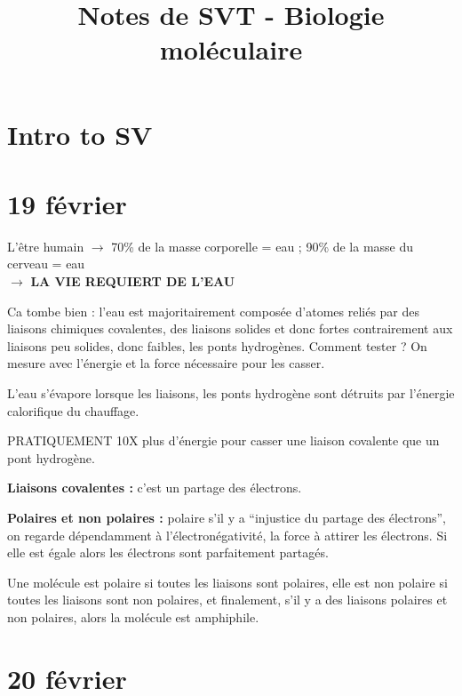 \documentclass[11pt]{article}
\title{Notes de SVT - Biologie moléculaire}
\date{}
\begin{document}
\maketitle



\section*{Intro to SV}

\section*{19 février}

L'être humain $\rightarrow$ 70\% de la masse corporelle = eau ; 90\% de la masse du cerveau = eau\\
$\rightarrow$ \textbf{LA VIE REQUIERT DE L'EAU}

\vspace{0.3cm}

Ca tombe bien : l'eau est majoritairement composée d'atomes reliés par des liaisons chimiques covalentes, des liaisons solides et donc fortes contrairement aux liaisons peu solides, donc faibles, les ponts hydrogènes. Comment tester ? On mesure avec l'énergie et la force nécessaire pour les casser.

L'eau s'évapore lorsque les liaisons, les ponts hydrogène sont détruits par l'énergie calorifique du chauffage.

PRATIQUEMENT 10X plus d'énergie pour casser une liaison covalente que un pont hydrogène.

\vspace{0.3cm}

\textbf{Liaisons covalentes :} c'est un partage des électrons.

\textbf{Polaires et non polaires :} polaire s'il y a “injustice du partage des électrons”, on regarde dépendamment à l'électronégativité, la force à attirer les électrons. Si elle est égale alors les électrons sont parfaitement partagés.

Une molécule est polaire si toutes les liaisons sont polaires, elle est non polaire si toutes les liaisons sont non polaires, et finalement, s'il y a des liaisons polaires et non polaires, alors la molécule est amphiphile.

\section*{20 février}
\end{document}
